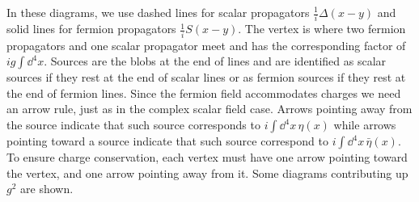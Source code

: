 In these diagrams, we use dashed lines for scalar propagators $\frac{1}{i}\Delta(x-y)$ and solid lines for fermion propagators $\frac{1}{i}S(x-y)$. The vertex is where two fermion propagators and one scalar propagator meet and has the corresponding factor of $ig\int\dd^4x$. Sources are the blobs at the end of lines and are identified as scalar sources if they rest at the end of scalar lines or as fermion sources if they rest at the end of fermion lines. Since the fermion field accommodates charges we need an arrow rule, just as in the complex scalar field case. Arrows pointing away from the source indicate that such source corresponds to  $i\int\dd^4 x\,\eta(x)$ while  arrows pointing toward a source indicate that such source correspond to $i\int\dd^4x\,\bar{\eta}(x)$. To ensure charge conservation, each vertex must have one arrow pointing toward the vertex, and one arrow pointing away from it. Some diagrams contributing up $g^2$ are shown.
